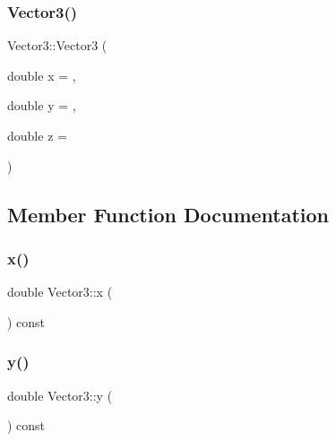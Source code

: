 \mbox{\label{class_vector3_a6151fc844ddb2aaa316317b922cb8d22}} 
\subsubsection{\texorpdfstring{Vector3()}{Vector3()}\hspace{0.1cm}{\footnotesize\ttfamily [3/3]}}
{\footnotesize\ttfamily Vector3\+::\+Vector3 (\begin{DoxyParamCaption}\item[{double}]{x = {},  }\item[{double}]{y = {},  }\item[{double}]{z = {} }\end{DoxyParamCaption})\hspace{0.3cm}{\ttfamily [explicit]}}



\subsection{Member Function Documentation}
\mbox{\label{class_vector3_a58680da7b1109919f9912cc8c5d4d54d}} 
\subsubsection{\texorpdfstring{x()}{x()}}
{\footnotesize\ttfamily double Vector3\+::x (\begin{DoxyParamCaption}{ }\end{DoxyParamCaption}) const}

\mbox{\label{class_vector3_aa86961f470134f1c7ca3eec7a88ad069}} 
\subsubsection{\texorpdfstring{y()}{y()}}
{\footnotesize\ttfamily double Vector3\+::y (\begin{DoxyParamCaption}{ }\end{DoxyParamCaption}) const}

\mbox{\label{class_vector3_aff9b42255ac1e08c52a5eda5a4513a48}} 
